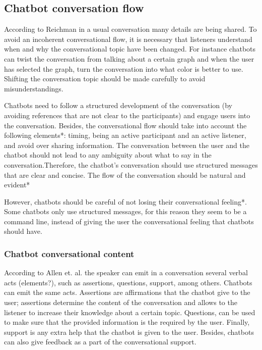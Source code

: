 \documentclass[a4paper,10pt]{article}
\begin{document}
\subsection*{Chatbot conversation flow}
According to Reichman \cite{reichman1985getting} in a usual conversation many details are being shared. To avoid an incoherent conversational flow, it is necessary that listeners understand when and why the conversational topic have been changed. For instance chatbots can twist the conversation from talking about a certain graph and when the user has selected the graph, turn the conversation into what color is better to use. Shifting the conversation topic should be made carefully to avoid misunderstandings. 

Chatbots need to follow a structured development of the conversation (by avoiding references that are not clear to the participants) and engage users into the conversation. Besides, the conversational flow should take into account the following elements*: timing, being an active participant and an active listener, and avoid over sharing information. 
The conversation between the user and the chatbot should not lead to any ambiguity about what to say in the conversation.Therefore, the chatbot's conversation should use structured messages that are clear and concise. The flow of the conversation should be natural and evident*

However, chatbots should be careful of not losing their conversational feeling*. Some chatbots only use structured messages, for this reason they seem to be a command line, instead of giving the user the conversational feeling that chatbots should have.  


\subsubsection*{Chatbot conversational content}

According to Allen et. al. \cite{allen1978conversation} the speaker can emit in a conversation several verbal acts (elements?), such as assertions, questions, support, among others. Chatbots can emit the same acts. Assertions are affirmations that the chatbot give to the user; assertions determine the content of the conversation and allows to the listener to increase their knowledge about a certain topic. Questions, can be used to make sure that the provided information is the required by the user. Finally, support is any extra help that the chatbot is given to the user. Besides, chatbots can also give feedback as a part of the conversational support. 
\end{document}
